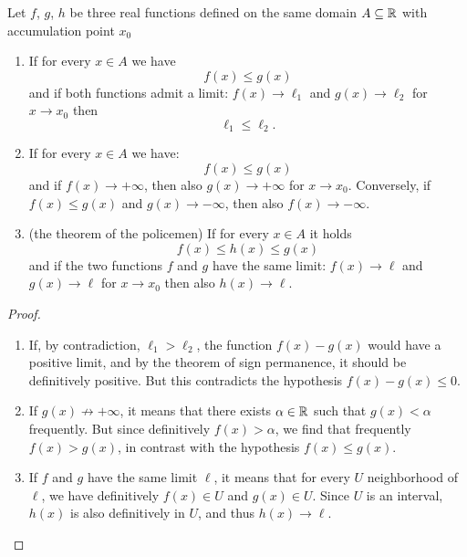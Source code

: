 \begin{theorem}
\label{th:confronto}%
%
%
%
%
\mymark{***}%
Let 
$f$, $g$, $h$ be three real functions%
defined on the same domain $A\subseteq {\mathbb R}$ 
with accumulation point $x_0$
%
\begin{enumerate}
\item
If for every $x\in A$ we have
\[
f(x) \le g(x)
\]
and if both functions admit a limit: $f(x) \to \ell_1$ 
and $g(x) \to \ell_2$ for $x\to x_0$
then
\[
\ell_1 \le \ell_2.
\]

\item
If for every $x\in A$ we have:
\[
f(x) \le g(x)
\]
and if $f(x)\to +\infty$, then also $g(x) \to +\infty$ for $x\to x_0$.
Conversely, if $f(x) \le g(x)$ and $g(x) \to -\infty$, then also $f(x) \to
-\infty$.

\item
(the theorem of the policemen)
If for every $x\in A$ it holds
%
%
\[
f(x) \le h(x) \le g(x)
\]
 and if the two
functions $f$ and $g$ have the same limit: $f(x) \to \ell$ and $g(x)\to \ell$
for $x\to x_0$
then also $h(x) \to \ell$.
\end{enumerate}
\end{theorem}
%
\begin{proof}
\mymark{**}
\begin{enumerate}
\item
If, by contradiction, $\ell_1 > \ell_2$,
the function $f(x)-g(x)$ would have a positive limit, and by the theorem
of sign permanence, it should be definitively positive. 
But this contradicts the hypothesis $f(x)-g(x)\le 0$. 

\item 
If $g(x)\not\to +\infty$, it means that 
there exists $\alpha \in {\mathbb R}$ such that $g(x)<\alpha$ frequently. 
But since definitively $f(x)>\alpha$, we find 
that frequently $f(x)>g(x)$, in contrast with the hypothesis 
$f(x)\le g(x)$.

\item
If $f$ and $g$ have the same limit $\ell$, it means that for every
$U$ neighborhood of $\ell$, we have definitively $f(x)\in U$ and $g(x)\in U$.
Since $U$ is an interval, $h(x)$ is also definitively in $U$, 
and thus $h(x)\to \ell$.
\end{enumerate}
\end{proof}

